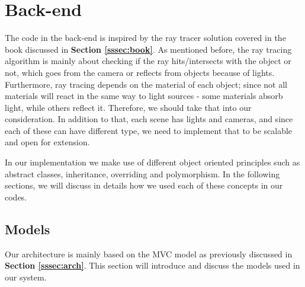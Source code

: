 \documentclass[a4paper]{report}
\begin{document}
	\label{ch:imp}\section{Back-end}
	The code in the back-end is inspired by the ray tracer solution covered in the book discussed in \textbf{Section \ref{sssec:book}}. As mentioned before, the ray tracing algorithm is mainly about checking if the ray hits/intersects with the object or not, which goes from the camera or reflects from objects because of lights. Furthermore, ray tracing depends on the material of each object; since not all materials will react in the same way to light sources - some materials absorb light, while others reflect it.	Therefore, we should take that into our consideration. In addition to that, each scene has lights and cameras, and since each of these can have different type, we need to implement that to be scalable and open for extension.\newline
	\par In our implementation we make use of different object oriented principles such as abstract classes, inheritance, overriding and polymorphism. In the following sections, we will discuss in details how we used each of these concepts in our codes.
	\subsection{Models}
	Our architecture is mainly based on the MVC model as previously discussed in \textbf{Section \ref{sssec:arch}}. This section will introduce and discuss the models used in our system.
\end{document}

